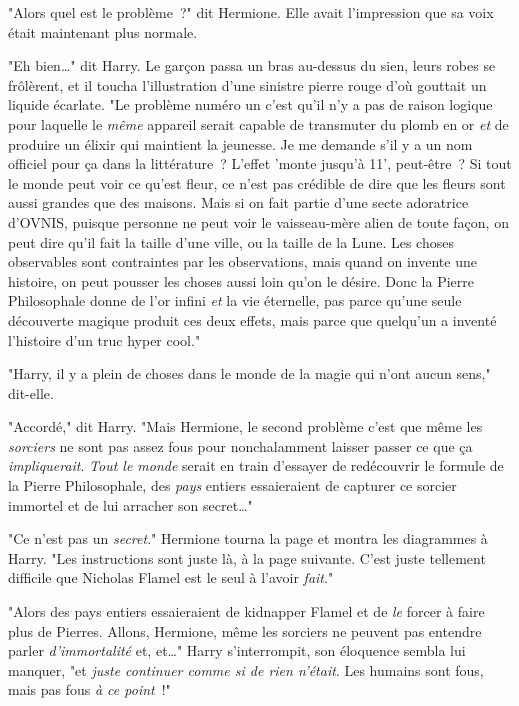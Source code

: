"Alors quel est le problème~?" dit Hermione. Elle avait l'impression que sa voix était maintenant plus normale.

"Eh bien…" dit Harry. Le garçon passa un bras au-dessus du sien, leurs robes se frôlèrent, et il toucha l'illustration d'une sinistre pierre rouge d'où gouttait un liquide écarlate. "Le problème numéro un c'est qu'il n'y a pas de raison logique pour laquelle le \emph{même} appareil serait capable de transmuter du plomb en or \emph{et} de produire un élixir qui maintient la jeunesse. Je me demande s'il y a un nom officiel pour ça dans la littérature~? L'effet 'monte jusqu'à 11', peut-être~? Si tout le monde peut voir ce qu'est fleur, ce n'est pas crédible de dire que les fleurs sont aussi grandes que des maisons. Mais si on fait partie d'une secte adoratrice d'OVNIS, puisque personne ne peut voir le vaisseau-mère alien de toute façon, on peut dire qu'il fait la taille d'une ville, ou la taille de la Lune. Les choses observables sont contraintes par les observations, mais quand on invente une histoire, on peut pousser les choses aussi loin qu'on le désire. Donc la Pierre Philosophale donne de l'or infini \emph{et} la vie éternelle, pas parce qu'une seule découverte magique produit ces deux effets, mais parce que quelqu'un a inventé l'histoire d'un truc hyper cool."

"Harry, il y a plein de choses dans le monde de la magie qui n'ont aucun sens," dit-elle.

"Accordé," dit Harry. "Mais Hermione, le second problème c'est que même les \emph{sorciers} ne sont pas assez fous pour nonchalamment laisser passer ce que ça \emph{impliquerait}. \emph{Tout le monde} serait en train d'essayer de redécouvrir le formule de la Pierre Philosophale, des \emph{pays} entiers essaieraient de capturer ce sorcier immortel et de lui arracher son secret…"

"Ce n'est pas un \emph{secret}." Hermione tourna la page et montra les diagrammes à Harry. "Les instructions sont juste là, à la page suivante. C'est juste tellement difficile que Nicholas Flamel est le seul à l'avoir \emph{fait}."

"Alors des pays entiers essaieraient de kidnapper Flamel et de \emph{le} forcer à faire plus de Pierres. Allons, Hermione, même les sorciers ne peuvent pas entendre parler \emph{d'immortalité} et, et…" Harry s'interrompit, son éloquence sembla lui manquer, "et \emph{juste continuer comme si de rien n'était}. Les humains sont fous, mais pas fous \emph{à ce point}~!"

